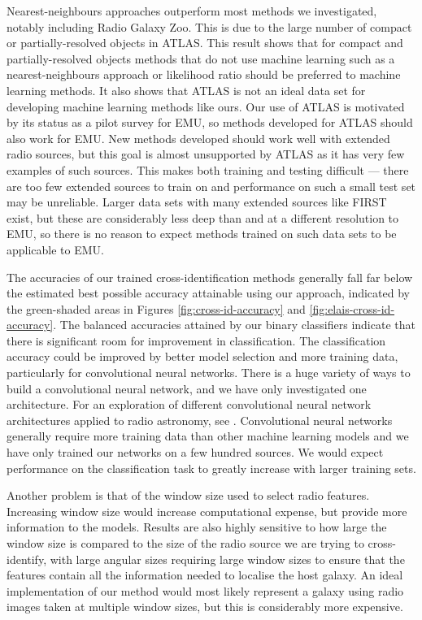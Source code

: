 \documentclass[fleqn,usenatbib,usedcolumn]{mnras}
\begin{document}
  Nearest-neighbours approaches outperform most methods we investigated,
  notably including Radio Galaxy Zoo. This is due to the large number of
  compact or partially-resolved objects in ATLAS. This result shows that for
  compact and partially-resolved objects methods that do not use machine
  learning such as a nearest-neighbours approach or likelihood ratio
  \citep{weston18lrpy} should be preferred to machine learning methods. It
  also shows that ATLAS is not an ideal data set for developing machine
  learning methods like ours. Our use of ATLAS is motivated by its status as a
  pilot survey for EMU, so methods developed for ATLAS should also work for
  EMU. New methods developed should work well with extended radio sources, but
  this goal is almost unsupported by ATLAS as it has very few examples of such
  sources. This makes both training and testing difficult --- there are too
  few extended sources to train on and performance on such a small test set
  may be unreliable. Larger data sets with many extended sources like FIRST
  exist, but these are considerably less deep than and at a different
  resolution to EMU, so there is no reason to expect methods trained on such
  data sets to be applicable to EMU.

  The accuracies of our trained cross-identification methods generally fall
  far below the estimated best possible accuracy attainable using our approach,
  indicated by the green-shaded areas in Figures \ref{fig:cross-id-accuracy} and
  \ref{fig:elais-cross-id-accuracy}. The balanced accuracies attained by our
  binary classifiers indicate that there is significant room for improvement
  in classification. The classification accuracy could be improved by better
  model selection and more training data, particularly for convolutional
  neural networks. There is a huge variety of ways to build a convolutional
  neural network, and we have only investigated one architecture. For an
  exploration of different convolutional neural network architectures applied
  to radio astronomy, see \citet{lukic18compact}. Convolutional neural
  networks generally require more training data than other machine learning
  models and we have only trained our networks on a few hundred sources. We
  would expect performance on the classification task to greatly increase
  with larger training sets.

  Another problem is that of the window size used to select radio features.
  Increasing window size would increase computational expense, but provide
  more information to the models. Results are also highly sensitive to how
  large the window size is compared to the size of the radio source we are
  trying to cross-identify, with large angular sizes requiring large window
  sizes to ensure that the features contain all the information needed to
  localise the host galaxy. An ideal implementation of our method would most
  likely represent a galaxy using radio images taken at multiple window
  sizes, but this is considerably more expensive.
\end{document}

